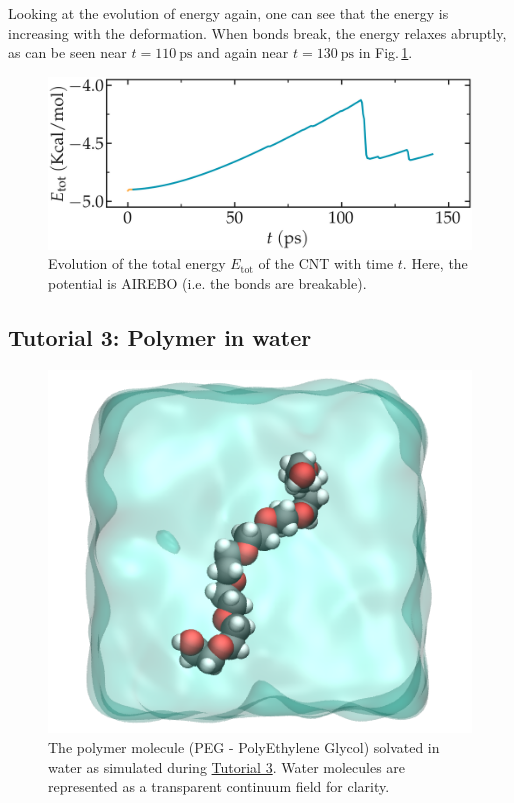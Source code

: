 \documentclass[9pt,tutorial]{livecoms}
\begin{document}
Looking at the evolution of energy again, one can see that the energy is increasing with the deformation. When bonds break, the energy relaxes abruptly, as can be seen near $t=110~\text{ps}$ and again near $t=130~\text{ps}$ in Fig.\,\ref{fig:CNT-breakable-energy}.

\begin{figure}
\centering
\includegraphics[width=\linewidth]{CNT-energy-breakable}
\caption{Evolution of the total energy $E_\text{tot}$ of the CNT with time $t$. Here, the potential is AIREBO (i.e. the bonds are breakable).}
\label{fig:CNT-breakable-energy}
\end{figure}

\subsection{Tutorial 3: Polymer in water}
\label{all-atoms-label}

\begin{figure}
\centering
\includegraphics[width=0.55\linewidth]{PEG}
\caption{The polymer molecule (PEG - PolyEthylene Glycol) solvated in water as simulated during \hyperref[all-atoms-label]{Tutorial 3}. Water molecules are represented as a transparent continuum field for clarity.}
\label{fig:PEG}
\end{figure}
\end{document}

